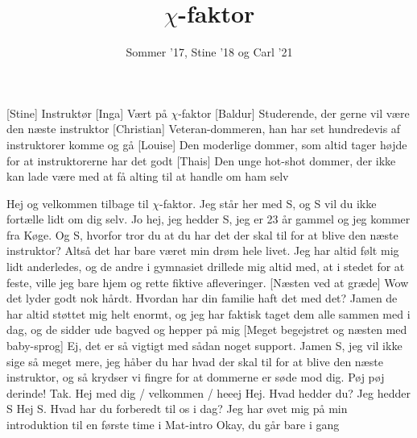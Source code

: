 \documentclass[a4paper,11pt]{article}
\title{$\chi$-faktor}
\author{Sommer '17, Stine '18 og Carl '21}
\begin{document}
\maketitle

\begin{roles}
[Stine] Instruktør
[Inga] Vært på $\chi$-faktor
[Baldur] Studerende, der gerne vil være den næste instruktor
[Christian] Veteran-dommeren, han har set hundredevis af instruktorer komme og gå
[Louise] Den moderlige dommer, som altid tager højde for at instruktorerne har det godt
[Thais] Den unge hot-shot dommer, der ikke kan lade være med at få alting til at handle om ham selv
\end{roles}

\begin{sketch}
 Hej og velkommen tilbage til $\chi$-faktor. Jeg står her med S, og S vil du ikke fortælle lidt om dig selv.
 Jo hej, jeg hedder S, jeg er 23 år gammel og jeg kommer fra Køge.
 Og S, hvorfor tror du at du har det der skal til for at blive den næste instruktor?
 Altså det har bare været min drøm hele livet. Jeg har altid følt mig lidt anderledes, og de andre i gymnasiet drillede mig altid med, at i stedet for at feste, ville jeg bare hjem og rette fiktive afleveringer.
[Næsten ved at græde] Wow det lyder godt nok hårdt. Hvordan har din familie haft det med det?
 Jamen de har altid støttet mig helt enormt, og jeg har faktisk taget dem alle sammen med i dag, og de sidder ude bagved og hepper på mig
[Meget begejstret og næsten med baby-sprog] Ej, det er så vigtigt med sådan noget support. Jamen S, jeg vil ikke sige så meget mere, jeg håber du har hvad der skal til for at blive den næste instruktor, og så krydser vi fingre for at dommerne er søde mod dig. Pøj pøj derinde!
 Tak.
  Hej med dig / velkommen / heeej
 Hej.
 Hvad hedder du?
 Jeg hedder S
 Hej S. Hvad har du forberedt til os i dag?
 Jeg har øvet mig på min introduktion til en første time i Mat-intro
 Okay, du går bare i gang

\end{sketch}
\end{document}
